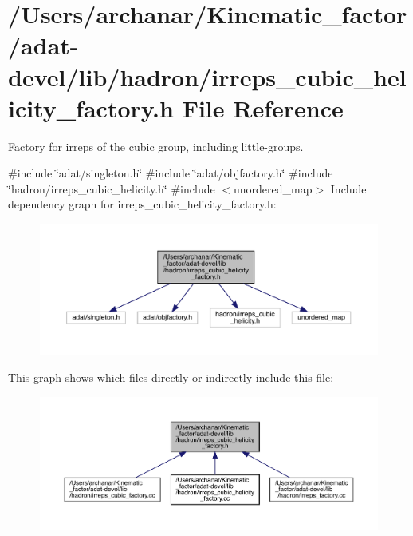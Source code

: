\hypertarget{adat-devel_2lib_2hadron_2irreps__cubic__helicity__factory_8h}{}\section{/\+Users/archanar/\+Kinematic\+\_\+factor/adat-\/devel/lib/hadron/irreps\+\_\+cubic\+\_\+helicity\+\_\+factory.h File Reference}
\label{adat-devel_2lib_2hadron_2irreps__cubic__helicity__factory_8h}


Factory for irreps of the cubic group, including little-\/groups.  


{\ttfamily \#include \char`\"{}adat/singleton.\+h\char`\"{}}\newline
{\ttfamily \#include \char`\"{}adat/objfactory.\+h\char`\"{}}\newline
{\ttfamily \#include \char`\"{}hadron/irreps\+\_\+cubic\+\_\+helicity.\+h\char`\"{}}\newline
{\ttfamily \#include $<$unordered\+\_\+map$>$}\newline
Include dependency graph for irreps\+\_\+cubic\+\_\+helicity\+\_\+factory.\+h\+:
\nopagebreak
\begin{figure}[H]
\begin{center}
\leavevmode
\includegraphics[width=350pt]{d0/dcc/adat-devel_2lib_2hadron_2irreps__cubic__helicity__factory_8h__incl}
\end{center}
\end{figure}
This graph shows which files directly or indirectly include this file\+:
\nopagebreak
\begin{figure}[H]
\begin{center}
\leavevmode
\includegraphics[width=350pt]{d4/d94/adat-devel_2lib_2hadron_2irreps__cubic__helicity__factory_8h__dep__incl}
\end{center}
\end{figure}
